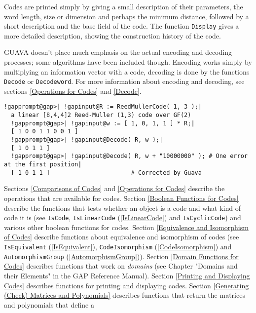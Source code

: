 \documentclass[a4paper,11pt]{report}
\begin{document}
{ Codes are printed simply by giving a small description of their parameters,
the word length, size or dimension and perhaps the minimum distance, followed
by a short description and the base field of the code. The function \texttt{Display} gives a more detailed description, showing the construction history of the
code. 

 \textsf{GUAVA} doesn't place much emphasis on the actual encoding and decoding processes;
some algorithms have been included though. Encoding works simply by
multiplying an information vector with a code, decoding is done by the
functions \texttt{Decode} or \texttt{Decodeword}. For more information about encoding and decoding, see sections \ref{Operations for Codes} and \ref{Decode}. 
\begin{Verbatim}[commandchars=!@|,fontsize=\small,frame=single,label=Example]
  !gapprompt@gap>| !gapinput@R := ReedMullerCode( 1, 3 );|
  a linear [8,4,4]2 Reed-Muller (1,3) code over GF(2)
  !gapprompt@gap>| !gapinput@w := [ 1, 0, 1, 1 ] * R;|
  [ 1 0 0 1 1 0 0 1 ]
  !gapprompt@gap>| !gapinput@Decode( R, w );|
  [ 1 0 1 1 ]
  !gapprompt@gap>| !gapinput@Decode( R, w + "10000000" ); # One error at the first position|
  [ 1 0 1 1 ]                       # Corrected by Guava 
\end{Verbatim}
  Sections \ref{Comparisons of Codes} and \ref{Operations for Codes} describe the operations that are available for codes. Section \ref{Boolean Functions for Codes} describe the functions that tests whether an object is a code and what kind of
code it is (see \texttt{IsCode}, \texttt{IsLinearCode} (\ref{IsLinearCode}) and \texttt{IsCyclicCode}) and various other boolean functions for codes. Section \ref{Equivalence and Isomorphism of Codes} describe functions about equivalence and isomorphism of codes (see \texttt{IsEquivalent} (\ref{IsEquivalent}), \texttt{CodeIsomorphism} (\ref{CodeIsomorphism}) and \texttt{AutomorphismGroup} (\ref{AutomorphismGroup})). Section \ref{Domain Functions for Codes} describes functions that work on \emph{domains} (see Chapter "Domains and their Elements" in the GAP Reference Manual).
Section \ref{Printing and Displaying Codes} describes functions for printing and displaying codes. Section \ref{Generating (Check) Matrices and Polynomials} describes functions that return the matrices and polynomials that define a
}
\end{document}
